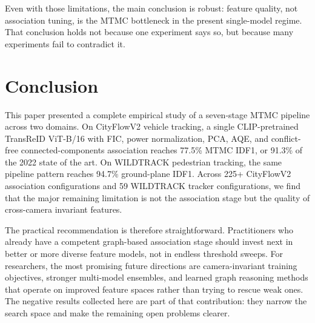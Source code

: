 \documentclass{ieeeaccess}
\begin{document}
Even with those limitations, the main conclusion is robust: feature quality, not association tuning, is the MTMC bottleneck in the present single-model regime. That conclusion holds not because one experiment says so, but because many experiments fail to contradict it.

\section{Conclusion}
This paper presented a complete empirical study of a seven-stage MTMC pipeline across two domains. On CityFlowV2 vehicle tracking, a single CLIP-pretrained TransReID ViT-B/16 with FIC, power normalization, PCA, AQE, and conflict-free connected-components association reaches 77.5\% MTMC IDF1, or 91.3\% of the 2022 state of the art. On WILDTRACK pedestrian tracking, the same pipeline pattern reaches 94.7\% ground-plane IDF1. Across 225+ CityFlowV2 association configurations and 59 WILDTRACK tracker configurations, we find that the major remaining limitation is not the association stage but the quality of cross-camera invariant features.

The practical recommendation is therefore straightforward. Practitioners who already have a competent graph-based association stage should invest next in better or more diverse feature models, not in endless threshold sweeps. For researchers, the most promising future directions are camera-invariant training objectives, stronger multi-model ensembles, and learned graph reasoning methods that operate on improved feature spaces rather than trying to rescue weak ones. The negative results collected here are part of that contribution: they narrow the search space and make the remaining open problems clearer.
\end{document}
